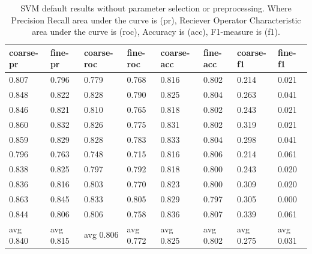 \documentclass[ms]{nuthesis}
\begin{document}
\FloatBarrier
\begin{table}[H]
\centering
\begin{tabular}{|l||l||l||l||l||l||l||l|}\toprule
coarse-pr & fine-pr & coarse-roc & fine-roc & coarse-acc & fine-acc & coarse-f1 & fine-f1 \\ \midrule
0.807 & 0.796 & 0.779 & 0.768 & 0.816 & 0.802 & 0.214 & 0.021 \\
0.848 & 0.822 & 0.828 & 0.790 & 0.825 & 0.804 & 0.263 & 0.041 \\
0.846 & 0.821 & 0.810 & 0.765 & 0.818 & 0.802 & 0.243 & 0.021 \\
0.860 & 0.832 & 0.826 & 0.775 & 0.831 & 0.802 & 0.319 & 0.021 \\
0.859 & 0.829 & 0.828 & 0.783 & 0.833 & 0.804 & 0.298 & 0.041 \\
0.796 & 0.763 & 0.748 & 0.715 & 0.816 & 0.806 & 0.214 & 0.061 \\
0.838 & 0.825 & 0.797 & 0.792 & 0.818 & 0.800 & 0.243 & 0.020 \\
0.836 & 0.816 & 0.803 & 0.770 & 0.823 & 0.800 & 0.309 & 0.020 \\
0.863 & 0.845 & 0.833 & 0.805 & 0.829 & 0.797 & 0.305 & 0.000 \\
0.844 & 0.806 & 0.806 & 0.758 & 0.836 & 0.807 & 0.339 & 0.061 \\
avg 0.840 & avg 0.815 & avg 0.806 & avg 0.772 & avg 0.825 & avg 0.802 & avg 0.275 & avg 0.031 \\ \bottomrule
\end{tabular}
\caption{SVM default results without parameter selection or preprocessing. Where Precision Recall
area under the curve is (pr), Reciever Operator Characteristic area under the curve is (roc), Accuracy
is (acc), F1-measure is (f1).}
\label{tab:SVMDefResStats}
\end{table}
\FloatBarrier
\end{document}

